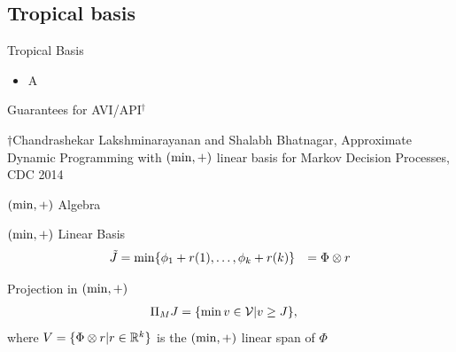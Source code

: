 \documentclass[10pt]{beamer}
\begin{document}
\subsection{Tropical basis}
\begin{frame}[fragile]{Tropical Basis}
\begin{itemize}
\item A
\end{itemize}
\end{frame}
\begin{frame}

\begin{block}{}
\centering
\alert{Guarantees for AVI/API$^{\dagger}$}
\end{block}
\tiny
\begin{block}{}
$\dagger$Chandrashekar Lakshminarayanan and Shalabh Bhatnagar, Approximate Dynamic Programming with $(\min,+)$ linear basis for Markov Decision Processes, CDC 2014
\end{block}
\end{frame}

\begin{frame}{$(\min,+)$ Algebra}
\begin{block}{$(\min,+)$ Linear Basis}
\vspace{-10pt}
\begin{align*}
\tilde{J}&=\min\{\phi_{1}+r(1),\ldots,\phi_{k}+r(k)\}
&=\Phi \otimes r
\end{align*}
\end{block}

\vspace{-10pt}
\begin{block}{Projection in $(\min,+)$}
\vspace{-10pt}
\begin{align*}
\Pi_M J&=\{\min v \in \mathcal{V} | v \geq J\},
\end{align*}
where $V=\{\Phi \otimes r| r\in \mathbb{R}^k\}$ is the $(\min,+)$ linear span of $\Phi$
\end{block}
\end{frame}
\end{document}
